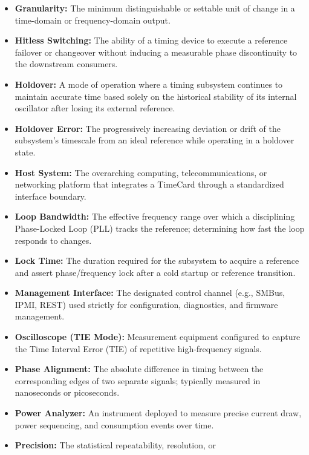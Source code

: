 \begin{itemize}
  \textbf{Frequency Counter:} A measurement instrument used to determine
  the exact signal frequency or period over a defined averaging
  interval.
\item
  \textbf{Granularity:} The minimum distinguishable or settable unit of
  change in a time-domain or frequency-domain output.
\item
  \textbf{Hitless Switching:} The ability of a timing device to execute
  a reference failover or changeover without inducing a measurable phase
  discontinuity to the downstream consumers.
\item
  \textbf{Holdover:} A mode of operation where a timing subsystem
  continues to maintain accurate time based solely on the historical
  stability of its internal oscillator after losing its external
  reference.
\item
  \textbf{Holdover Error:} The progressively increasing deviation or
  drift of the subsystem's timescale from an ideal reference while
  operating in a holdover state.
\item
  \textbf{Host System:} The overarching computing, telecommunications,
  or networking platform that integrates a TimeCard through a
  standardized interface boundary.
\item
  \textbf{Loop Bandwidth:} The effective frequency range over which a
  disciplining Phase-Locked Loop (PLL) tracks the reference; determining
  how fast the loop responds to changes.
\item
  \textbf{Lock Time:} The duration required for the subsystem to acquire
  a reference and assert phase/frequency lock after a cold startup or
  reference transition.
\item
  \textbf{Management Interface:} The designated control channel (e.g.,
  SMBus, IPMI, REST) used strictly for configuration, diagnostics, and
  firmware management.
\item
  \textbf{Oscilloscope (TIE Mode):} Measurement equipment configured to
  capture the Time Interval Error (TIE) of repetitive high-frequency
  signals.
\item
  \textbf{Phase Alignment:} The absolute difference in timing between
  the corresponding edges of two separate signals; typically measured in
  nanoseconds or picoseconds.
\item
  \textbf{Power Analyzer:} An instrument deployed to measure precise
  current draw, power sequencing, and consumption events over time.
\item
  \textbf{Precision:} The statistical repeatability, resolution, or

\end{itemize}
